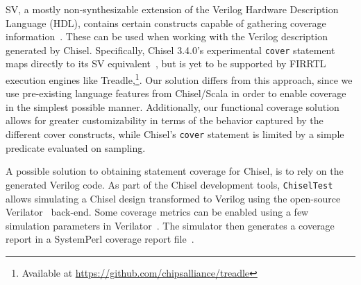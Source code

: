 \documentclass[conference]{IEEEtran}
\begin{document}
SV, a mostly non-synthesizable extension of the Verilog Hardware Description Language (HDL), contains certain constructs capable of gathering coverage information~\cite{spear2008systemverilog}. These can be used when working with the Verilog description generated by Chisel. Specifically, Chisel 3.4.0's experimental \texttt{cover} statement maps directly to its SV equivalent~\cite{chisel3.4release_notes}, but is yet to be supported by FIRRTL execution engines like Treadle,\footnote{Available at \url{https://github.com/chipsalliance/treadle}}. %
Our solution differs from this approach, since we use pre-existing language features from Chisel/Scala in order to enable coverage in the simplest possible manner. Additionally, our functional coverage solution allows for greater customizability in terms of the behavior captured by the different cover constructs, while Chisel's \texttt{cover} statement is limited by a simple predicate evaluated on sampling.   
  
A possible solution to obtaining statement coverage for Chisel, is to rely on the generated Verilog code. 
As part of the Chisel development tools, \texttt{ChiselTest} allows simulating a Chisel design transformed to Verilog using the open-source Verilator~\cite{verilator} back-end.
Some coverage metrics can be enabled using a few simulation parameters in Verilator~\cite{tolotto2020}.
The simulator then generates a coverage report in a SystemPerl coverage report file~\cite{SystemPerl}.
\end{document}
